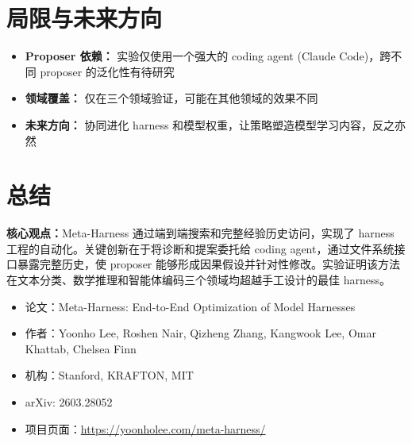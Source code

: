 \documentclass[12pt,a4paper]{article}
\newcommand{\keypoint}[1]{\textbf{核心观点：}#1}
\begin{document}
\section{局限与未来方向}

\begin{itemize}
    \item \textbf{Proposer 依赖：} 实验仅使用一个强大的 coding agent (Claude Code)，跨不同 proposer 的泛化性有待研究
    \item \textbf{领域覆盖：} 仅在三个领域验证，可能在其他领域的效果不同
    \item \textbf{未来方向：} 协同进化 harness 和模型权重，让策略塑造模型学习内容，反之亦然
\end{itemize}

\section{总结}

\keypoint{Meta-Harness 通过端到端搜索和完整经验历史访问，实现了 harness 工程的自动化。关键创新在于将诊断和提案委托给 coding agent，通过文件系统接口暴露完整历史，使 proposer 能够形成因果假设并针对性修改。实验证明该方法在文本分类、数学推理和智能体编码三个领域均超越手工设计的最佳 harness。}

\begin{tcolorbox}[colback=green!5,colframe=green!50,title=核心引用]
\begin{itemize}
    \item 论文：Meta-Harness: End-to-End Optimization of Model Harnesses
    \item 作者：Yoonho Lee, Roshen Nair, Qizheng Zhang, Kangwook Lee, Omar Khattab, Chelsea Finn
    \item 机构：Stanford, KRAFTON, MIT
    \item arXiv: 2603.28052
    \item 项目页面：\url{https://yoonholee.com/meta-harness/}
\end{itemize}
\end{tcolorbox}
\end{document}
